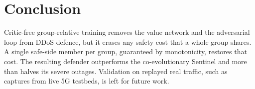 \documentclass[journal]{IEEEtran}
\begin{document}
\section{Conclusion}
Critic-free group-relative training removes the value network and the adversarial loop from DDoS defence, but it erases any safety cost that a whole group shares. A single safe-side member per group, guaranteed by monotonicity, restores that cost. The resulting defender outperforms the co-evolutionary Sentinel and more than halves its severe outages. Validation on replayed real traffic, such as captures from live 5G testbeds, is left for future work.



\end{document}
